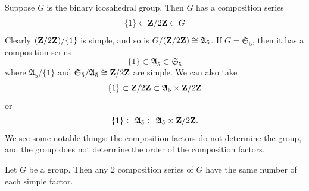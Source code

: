 \documentclass[11pt, twoside]{amsart}
\begin{document}
Suppose $G$ is the binary icosahedral group. Then $G$ has a composition series
$$
\{1\} \subset \mathbf{Z}/2\mathbf{Z}  \subset G
$$
Clearly $(\mathbf{Z}/2\mathbf{Z} ) / \{1\}$ is simple, and so is $G/(\mathbf{Z}/2\mathbf{Z} ) \cong \mathfrak{A}_5$. If $G =\mathfrak{S}_5$, then it has a composition series
$$
\{1\} \subset \mathfrak{A}_5 \subset \mathfrak{S}_5
$$
where $\mathfrak{A}_5/\{1\}$ and $\mathfrak{S}_5 /\mathfrak{A}_5 \cong \mathbf{Z}/2\mathbf{Z} $ are simple. We can also take 
$$
\{1\} \subset \mathbf{Z}/2\mathbf{Z}  \subset \mathfrak{A}_5\times\mathbf{Z}/2\mathbf{Z} 
$$
or 
$$
\{1\} \subset \mathfrak{A}_5 \subset\mathfrak{A}_5\times \mathbf{Z}/2\mathbf{Z} .
$$
We see some notable things: the composition factors do not determine the group, and the group does not determine the order of the composition factors. 
\begin{theorem} \label{jh}
Let $G$ be a group. Then any $2$ composition series of $G$ have the same number of each simple factor.
\end{theorem}
\end{document}
